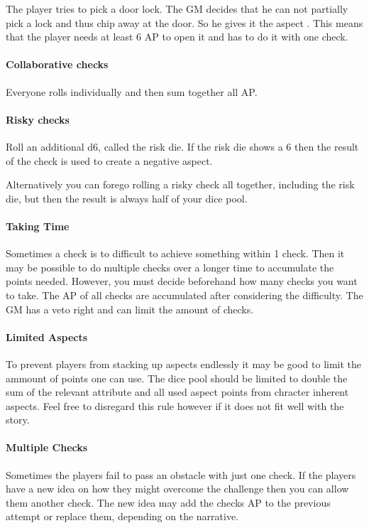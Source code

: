 \documentclass[11pt]{article}
\begin{document}
{\begin{pwexample}
The player tries to pick a door lock. The GM decides that he can not partially pick a lock and thus chip away at the door. So he gives it the aspect . This means that the player needs at least 6 AP to open it and has to do it with one check.
\end{pwexample}

\paragraph*{Collaborative checks}
\label{sec:org7efa56d}
Everyone rolls individually and then sum together all AP.

\paragraph*{Risky checks}
\label{sec:orgb8181f9}
Roll an additional d6, called the risk die. If the risk die shows a 6 then the result of the check is used to create a negative aspect.

Alternatively you can forego rolling a risky check all together, including the risk die, but then the result is always half of your dice pool.

\paragraph*{Taking Time}
\label{sec:org71cd458}
Sometimes a check is to difficult to achieve something within 1 check. Then it may be possible to do multiple checks over a longer time to accumulate the points needed. However, you must decide beforehand how many checks you want to take. The AP of all checks are accumulated after considering the difficulty. The GM has a veto right and can limit the amount of checks.

\paragraph*{Limited Aspects}
\label{sec:org240479f}
To prevent players from stacking up aspects endlessly it may be good to limit the ammount of points one can use. The dice pool should be limited to double the sum of the relevant attribute and all used aspect points from chracter inherent aspects. Feel free to disregard this rule however if it does not fit well with the story.

\paragraph*{Multiple Checks}
\label{sec:org789e569}
Sometimes the players fail to pass an obstacle with just one check. If the players have a new idea on how they might overcome the challenge then you can allow them another check. The new idea may add the checks AP to the previous attempt or replace them, depending on the narrative.

}
\end{document}
